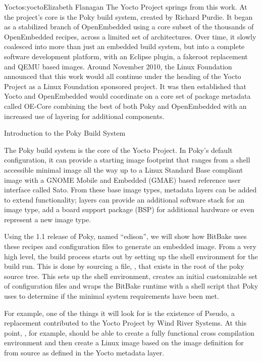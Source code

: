 \begin{aosachapter}{Yocto}{s:yocto}{Elizabeth Flanagan}
The Yocto Project springs from this work. At the project's core is the
Poky build system, created by Richard Purdie. It began as a stabilized
branch of OpenEmbedded using a core subset of the thousands of
OpenEmbedded recipes, across a limited set of architectures. Over
time, it slowly coalesced into more than just an embedded build
system, but into a complete software development platform, with an
Eclipse plugin, a fakeroot replacement and QEMU based images. Around
November 2010, the Linux Foundation announced that this work would all
continue under the heading of the Yocto Project as a Linux Foundation
sponsored project. It was then established that Yocto and OpenEmbedded
would coordinate on a core set of package metadata called OE-Core
combining the best of both Poky and OpenEmbedded with an increased use
of layering for additional components.

\begin{aosasect1}{Introduction to the Poky Build System}

The Poky build system is the core of the Yocto Project. In Poky's
default configuration, it can provide a starting image footprint that
ranges from a shell accessible minimal image all the way up to a Linux
Standard Base compliant image with a GNOME Mobile and Embedded (GMAE)
based reference user interface called Sato. From these base image
types, metadata layers can be added to extend functionality; layers
can provide an additional software stack for an image type, add a
board support package (BSP) for additional hardware or even represent
a new image type.

Using the 1.1 release of Poky, named
``edison'',
we will show how BitBake uses these recipes and configuration
files to generate an embedded image. From a very high level, the build
process starts out by setting up the shell environment for the build
run. This is done by sourcing a file, , that exists
in the root of the poky source tree. This sets up the shell
environment, creates an initial customizable set of configuration
files and wraps the BitBake runtime with a shell script that Poky uses
to determine if the minimal system requirements have been met.

For example, one of the things it will look for is the existence of
Pseudo, a  replacement contributed to the Yocto Project by
Wind River Systems. At this point, , for
example, should be able to create a fully functional cross compilation
environment and then create a Linux image based on the image
definition for  from source as defined
in the Yocto metadata layer.


\end{aosasect1}
\end{aosachapter}
